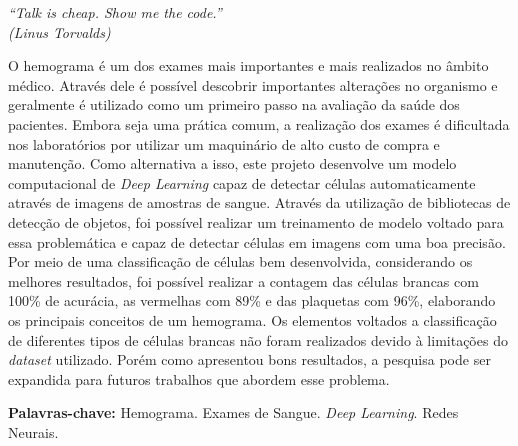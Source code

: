 \documentclass[
	10pt,				%
	oneside,
	a4paper,			%
	chapter=TITLE,		%
	english,			%
	brazil				%
	]{abntex2}
\begin{document}
\begin{epigrafe}
    \vspace*{\fill}
	\begin{flushright}
		\textit{``Talk is cheap. Show me the code.''\\
		(Linus Torvalds)}
	\end{flushright}
\end{epigrafe}

\setlength{\absparsep}{18pt} %
\begin{resumo}
    O hemograma é um dos exames mais importantes e mais realizados no âmbito médico. Através dele é possível descobrir importantes alterações no organismo e geralmente é utilizado como um primeiro passo na avaliação da saúde dos pacientes. Embora seja uma prática comum, a realização dos exames é dificultada nos laboratórios por utilizar um maquinário de alto custo de compra e manutenção. Como alternativa a isso, este projeto desenvolve um modelo computacional de \emph{Deep Learning} capaz de detectar células automaticamente através de imagens de amostras de sangue. Através da utilização de bibliotecas de detecção de objetos, foi possível realizar um treinamento de modelo voltado para essa problemática e capaz de detectar células em imagens com uma boa precisão. Por meio de uma classificação de células bem desenvolvida, considerando os melhores resultados, foi possível realizar a contagem das células brancas com 100\% de acurácia, as vermelhas com 89\% e das plaquetas com 96\%, elaborando os principais conceitos de um hemograma. Os elementos voltados a classificação de diferentes tipos de células brancas não foram realizados devido à limitações do \emph{dataset} utilizado. Porém como apresentou bons resultados, a pesquisa pode ser expandida para futuros trabalhos que abordem esse problema.
	
	\textbf{Palavras-chave:} Hemograma. Exames de Sangue. \emph{Deep Learning}. Redes Neurais.
\end{resumo}
\end{document}
